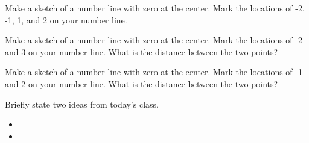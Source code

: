 
\begin{problem}
\item Make a sketch of a number line with zero at the center.
  Mark the locations of -2, -1, 1, and 2 on your number line.

  \vfill

\item Make a sketch of a number line with zero at the center.
  Mark the locations of -2 and 3 on your number line. What is the
  distance between the two points?

  \vfill

\item Make a sketch of a number line with zero at the center.
  Mark the locations of -1 and 2 on your number line. What is the
  distance between the two points?

  \vfill

\end{problem}


\begin{problem}
\item 
  \begin{subproblem}
    \item
  \end{subproblem}
\end{problem}


\postClass

\begin{problem}
\item Briefly state two ideas from today's class.
  \begin{itemize}
  \item 
  \item 
  \end{itemize}
\item 
  \begin{subproblem}
    \item
  \end{subproblem}
\end{problem}

